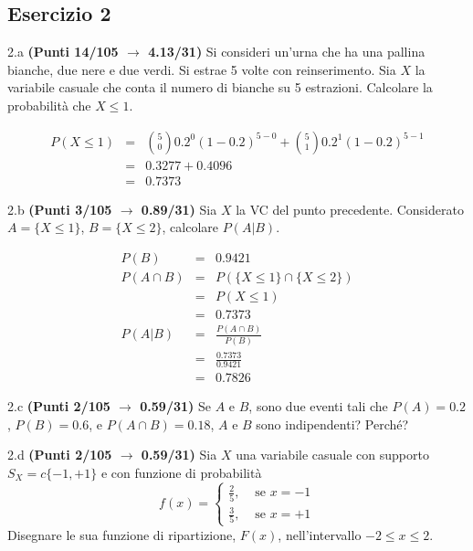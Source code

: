 \documentclass[
  11pt,
]{book}
\theoremstyle{mytheoremstyle}
\theoremstyle{mydefstyle}
\newenvironment{sol}
  {
  \begin{tcolorbox}[enhanced,breakable,arc=0.1mm,boxrule=1pt,colback=white,colframe=iblue,
  title=\bf \fontfamily{lmss}\selectfont \hspace{.5 cm} Soluzione,drop fuzzy shadow]

}{
\end{tcolorbox}
  }
\begin{document}
\subsection{Esercizio 2}\label{esercizio-2-40}

2.a \textbf{(Punti 14/105 \(\rightarrow\) 4.13/31)} Si consideri un'urna che ha una pallina bianche, due nere e due verdi. Si estrae 5 volte con reinserimento. Sia \(X\) la variabile casuale che conta il numero di bianche su 5 estrazioni. Calcolare la probabilità che \(X\leq 1\).

\begin{sol}
\normalsize 
\begin{eqnarray*}
      P( X \leq 1 ) &=& \binom{ 5 }{ 0 } 0.2 ^{ 0 }(1- 0.2 )^{ 5 - 0 }+\binom{ 5 }{ 1 } 0.2 ^{ 1 }(1- 0.2 )^{ 5 - 1 } \\                 &=& 0.3277+0.4096 \\                 &=& 0.7373 
   \end{eqnarray*}
\normalsize 

\end{sol}

2.b \textbf{(Punti 3/105 \(\rightarrow\) 0.89/31)} Sia \(X\) la VC del punto precedente. Considerato \(A=\{X\leq 1\}\), \(B=\{X\leq 2\}\), calcolare \(P(A|B)\).

\begin{sol}
\begin{eqnarray*}
  P(B) &=&  0.9421\\
  P(A\cap B) &=& P( \{X \leq 1\} \cap \{X \leq 2\})\\
             &=& P(  X \leq 1)\\
             &=& 0.7373\\
  P(A|B)     &=& \frac{P(A\cap B)}{P(B)}\\
             &=& \frac{0.7373}{0.9421}\\
             &=& 0.7826
\end{eqnarray*}

\end{sol}

2.c \textbf{(Punti 2/105 \(\rightarrow\) 0.59/31)} Se \(A\) e \(B\), sono due eventi tali che \(P(A)=0.2\), \(P(B)=0.6\), e \(P(A\cap B)=0.18\), \(A\) e \(B\) sono indipendenti? Perché?

2.d \textbf{(Punti 2/105 \(\rightarrow\) 0.59/31)} Sia \(X\) una variabile casuale con supporto \(S_X=c\{-1,+1\}\) e con funzione di probabilità
\[
f(x)=\begin{cases}
\frac 25, &\text{ se $x=-1$}\\
\frac 35, &\text{ se $x=+1$}
\end{cases}
\]
Disegnare le sua funzione di ripartizione, \(F(x)\), nell'intervallo \(-2\leq x\leq 2\).
\end{document}
